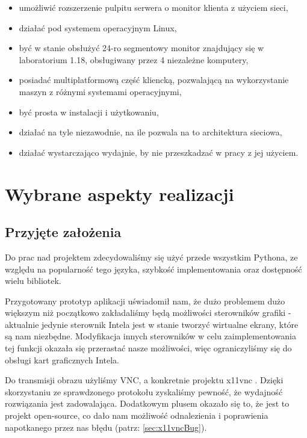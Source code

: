   \begin{itemize}[noitemsep]
    \item umożliwić rozszerzenie pulpitu serwera o monitor klienta z użyciem sieci,
    \item działać pod systemem operacyjnym Linux,
    \item być w stanie obsłużyć 24-ro segmentowy monitor znajdujący się w laboratorium 1.18, obsługiwany przez 4 niezależne komputery,
    \item posiadać multiplatformową część kliencką, pozwalającą na wykorzystanie maszyn z różnymi systemami operacyjnymi,
    \item być prosta w instalacji i użytkowaniu,
    \item działać na tyle niezawodnie, na ile pozwala na to architektura sieciowa,
    \item działać wystarczająco wydajnie, by nie przeszkadzać w pracy z jej użyciem.
  \end{itemize}

\section{Wybrane aspekty realizacji}

  \subsection{Przyjęte założenia}

    Do prac nad projektem zdecydowaliśmy się użyć przede wszystkim Pythona, ze względu na popularność tego języka, szybkość implementowania oraz dostępność wielu bibliotek.

    Przygotowany prototyp aplikacji uświadomił nam, że dużo problemem dużo większym niż początkowo zakładaliśmy będą możliwości sterowników grafiki - aktualnie jedynie sterownik Intela jest w stanie tworzyć wirtualne ekrany, które są nam niezbędne. Modyfikacja innych sterowników w celu zaimplementowania tej funkcji okazała się przerastać nasze możliwości, więc ograniczyliśmy się do obsługi kart graficznych Intela.

    Do transmisji obrazu użyliśmy VNC, a konkretnie projektu x11vnc \cite{x11vncProj}. Dzięki skorzystaniu ze sprawdzonego protokołu zyskaliśmy pewność, że wydajność rozwiązania jest zadowalająca. Dodatkowym plusem okazało się to, że jest to projekt open-source, co dało nam możliwość odnalezienia i poprawienia napotkanego przez nas błędu (patrz: \ref{sec:x11vncBug}).

